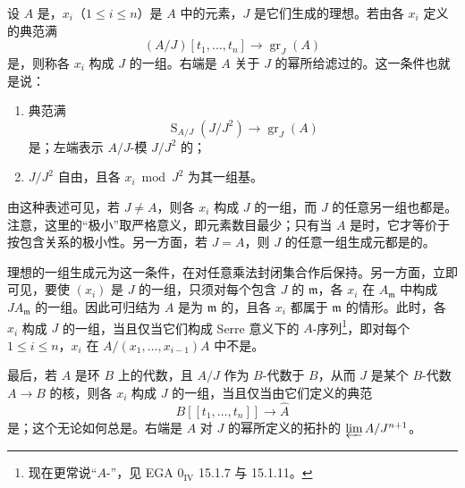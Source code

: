 设 $A$ 是，$x_i$（$1\leq i\leq n$）是 $A$ 中的元素，$J$ 是它们生成的理想。若由各 $x_i$ 定义的典范满
\[
(A/J)[t_1,\ldots,t_n]\longrightarrow\operatorname{gr}_J(A)
\]
是，则称各 $x_i$ 构成 $J$ 的一组。右端是 $A$ 关于 $J$ 的幂所给滤过的。这一条件也就是说：
\begin{enumerate}
\item[(i)] 典范满
\[
\operatorname{S}_{A/J}(J/J^2)\longrightarrow\operatorname{gr}_J(A)
\]
是；左端表示 $A/J$-模 $J/J^2$ 的；
\item[(ii)] $J/J^2$ 自由，且各 $x_i\bmod J^2$ 为其一组基。
\end{enumerate}
由这种表述可见，若 $J\ne A$，则各 $x_i$ 构成 $J$ 的一组，而 $J$ 的任意另一组也都是。注意，这里的“极小”取严格意义，即元素数目最少；只有当 $A$ 是时，它才等价于按包含关系的极小性。另一方面，若 $J=A$，则 $J$ 的任意一组生成元都是的。

理想的一组生成元为这一条件，在对任意乘法封闭集合作后保持。另一方面，立即可见，要使 $(x_i)$ 是 $J$ 的一组，只须对每个包含 $J$ 的 $\mathfrak m$，各 $x_i$ 在 $A_{\mathfrak m}$ 中构成 $JA_{\mathfrak m}$ 的一组。因此可归结为 $A$ 是为 $\mathfrak m$ 的，且各 $x_i$ 都属于 $\mathfrak m$ 的情形。此时，各 $x_i$ 构成 $J$ 的一组，当且仅当它们构成 Serre 意义下的 $A$-序列\footnote{现在更常说“$A$-”，见 EGA $0_{\mathrm{IV}}$ 15.1.7 与 15.1.11。}，即对每个 $1\leq i\leq n$，$x_i$ 在 $A/(x_1,\ldots,x_{i-1})A$ 中不是。

最后，若 $A$ 是环 $B$ 上的代数，且 $A/J$ 作为 $B$-代数于 $B$，从而 $J$ 是某个 $B$-代数 $A\to B$ 的核，则各 $x_i$ 构成 $J$ 的一组，当且仅当由它们定义的典范
\[
B[[t_1,\ldots,t_n]]\longrightarrow\widehat A
\]
是；这个无论如何总是。右端是 $A$ 对 $J$ 的幂所定义的拓扑的 $\varprojlim A/J^{n+1}$。

